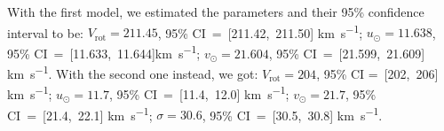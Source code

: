 With the first model, we estimated the parameters and their 95\% confidence interval to be: $V_{\text{rot}} = 211.45$, 95\% CI~=~[211.42,~211.50] \unit{\kilo\meter\per\second}; $u_{\odot} = 11.638$, 95\% CI~=~[11.633,~11.644]\unit{\kilo\meter\per\second}; $v_{\odot} = 21.604$, 95\% CI~=~[21.599,~21.609] \unit{\kilo\meter\per\second}. With the second one instead, we got: $V_{\text{rot}}= 204$, 95\% CI =~[202,~206] \unit{\kilo\meter\per\second}; $u_{\odot} = 11.7$, 95\% CI~=~[11.4,~12.0] \unit{\kilo\meter\per\second}; $v_{\odot} = 21.7$, 95\% CI~=~[21.4,~22.1] \unit{\kilo\meter\per\second}; $\sigma = 30.6$, 95\% CI~=~[30.5,~30.8] \unit{\kilo\meter\per\second}. 

